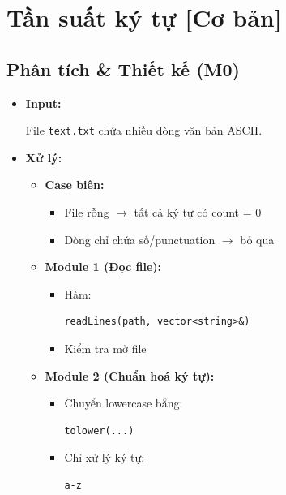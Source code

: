 \section{Tần suất ký tự [Cơ bản]}
\subsection{Phân tích \& Thiết kế (M0)}

\begin{itemize}

    \item \textbf{Input:}

    File \texttt{text.txt} chứa nhiều dòng văn bản ASCII.

    \item \textbf{Xử lý:}

    \begin{itemize}

        \item \textbf{Case biên:}

        \begin{itemize}
            \item File rỗng
            $\rightarrow$
            tất cả ký tự có count = 0
            \item Dòng chỉ chứa số/punctuation
            $\rightarrow$
            bỏ qua
        \end{itemize}

        \item \textbf{Module 1 (Đọc file):}

        \begin{itemize}
            \item Hàm:
\begin{lstlisting}
readLines(path, vector<string>&)
\end{lstlisting}

            \item Kiểm tra mở file
        \end{itemize}

        \item \textbf{Module 2 (Chuẩn hoá ký tự):}

        \begin{itemize}
            \item Chuyển lowercase bằng:
\begin{lstlisting}
tolower(...)
\end{lstlisting}

            \item Chỉ xử lý ký tự:
\begin{lstlisting}
a-z
\end{lstlisting}
        \end{itemize}


\end{itemize}
\end{itemize}
